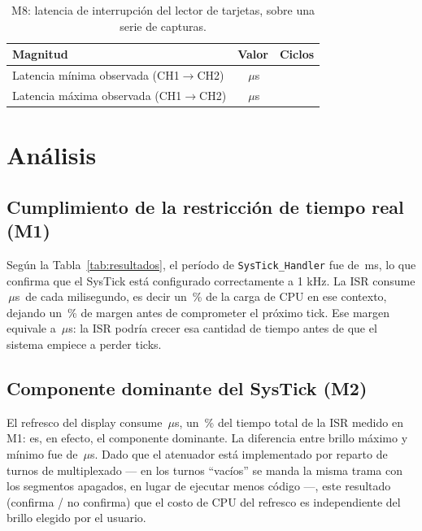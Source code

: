 \documentclass[11pt,a4paper]{article}
\newcommand{\dato}[1][2cm]{\underline{\hspace{#1}}}
\newcommand{\us}{\ensuremath{\mu}s}
\begin{document}
\begin{table}[H]
\centering
\begin{tabular}{@{}lcc@{}}
\toprule
\textbf{Magnitud} & \textbf{Valor} & \textbf{Ciclos} \\
\midrule
Latencia mínima observada (CH1$\to$CH2) & \dato[1.6cm]\,\us & \dato[1.5cm] \\
Latencia máxima observada (CH1$\to$CH2) & \dato[1.6cm]\,\us & \dato[1.5cm] \\
\bottomrule
\end{tabular}
\caption{M8: latencia de interrupción del lector de tarjetas, sobre una serie de capturas.}
\label{tab:latencia}
\end{table}

\newpage
\section{Análisis}
\label{sec:analisis}

\subsection{Cumplimiento de la restricción de tiempo real (M1)}

Según la Tabla~\ref{tab:resultados}, el período de \texttt{SysTick\_Handler}
fue de \dato\,ms, lo que confirma que el SysTick está configurado
correctamente a 1 kHz. La ISR consume \dato\,\us\ de cada milisegundo, es
decir un \dato\,\% de la carga de CPU en ese contexto, dejando un
\dato\,\% de margen antes de comprometer el próximo tick. Ese margen
equivale a \dato\,\us: la ISR podría crecer esa cantidad de tiempo antes de
que el sistema empiece a perder ticks.

\subsection{Componente dominante del SysTick (M2)}

El refresco del display consume \dato\,\us, un \dato\,\% del tiempo total
de la ISR medido en M1: es, en efecto, el componente dominante. La
diferencia entre brillo máximo y mínimo fue de \dato\,\us. Dado que el
atenuador está implementado por reparto de turnos de multiplexado --- en
los turnos ``vacíos'' se manda la misma trama con los segmentos apagados,
en lugar de ejecutar menos código ---, este resultado \dato{} (confirma /
no confirma) que el costo de CPU del refresco es independiente del brillo
elegido por el usuario.
\end{document}
